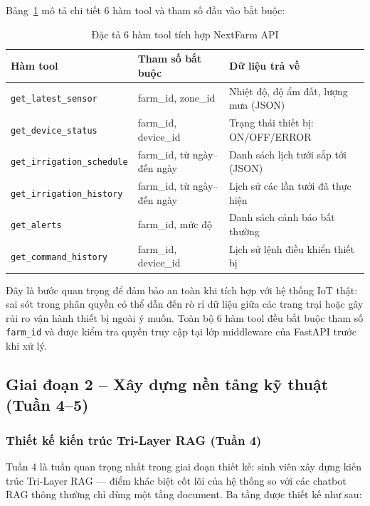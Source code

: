 Bảng~\ref{tab:iac-tool} mô tả chi tiết 6 hàm tool và tham số đầu vào bắt buộc:

\begin{table}[H]
\caption{Đặc tả 6 hàm tool tích hợp NextFarm API}
\label{tab:iac-tool}
\centering
\begin{tabular}{|p{4cm}|p{4.5cm}|p{5cm}|}
\hline
\textbf{Hàm tool} & \textbf{Tham số bắt buộc} & \textbf{Dữ liệu trả về} \\
\hline
\texttt{get\_latest\_sensor} & farm\_id, zone\_id & Nhiệt độ, độ ẩm đất, lượng mưa (JSON) \\
\hline
\texttt{get\_device\_status} & farm\_id, device\_id & Trạng thái thiết bị: ON/OFF/ERROR \\
\hline
\texttt{get\_irrigation\_schedule} & farm\_id, từ ngày--đến ngày & Danh sách lịch tưới sắp tới (JSON) \\
\hline
\texttt{get\_irrigation\_history} & farm\_id, từ ngày--đến ngày & Lịch sử các lần tưới đã thực hiện \\
\hline
\texttt{get\_alerts} & farm\_id, mức độ & Danh sách cảnh báo bất thường \\
\hline
\texttt{get\_command\_history} & farm\_id, device\_id & Lịch sử lệnh điều khiển thiết bị \\
\hline
\end{tabular}
\end{table}

Đây là bước quan trọng để đảm bảo an toàn khi tích hợp với hệ thống IoT thật: sai sót trong phân quyền có thể dẫn đến rò rỉ dữ liệu giữa các trang trại hoặc gây rủi ro vận hành thiết bị ngoài ý muốn. Toàn bộ 6 hàm tool đều bắt buộc tham số \texttt{farm\_id} và được kiểm tra quyền truy cập tại lớp middleware của FastAPI trước khi xử lý.

\subsection{Giai đoạn 2 -- Xây dựng nền tảng kỹ thuật (Tuần 4--5)}

\subsubsection{Thiết kế kiến trúc Tri-Layer RAG (Tuần 4)}

Tuần 4 là tuần quan trọng nhất trong giai đoạn thiết kế: sinh viên xây dựng kiến trúc Tri-Layer RAG --- điểm khác biệt cốt lõi của hệ thống so với các chatbot RAG thông thường chỉ dùng một tầng document. Ba tầng được thiết kế như sau:

